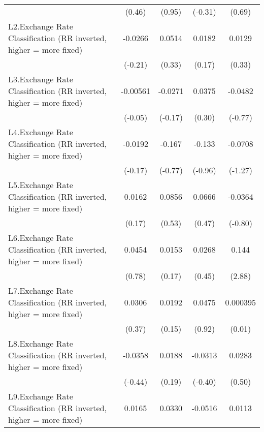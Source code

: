 {\begin{longtable}{l*{4}{c}}
                &   (0.46)         &   (0.95)         &  (-0.31)         &   (0.69)         \\
[1em]
L2.Exchange Rate Classification (RR inverted, higher = more fixed)&  -0.0266         &   0.0514         &   0.0182         &   0.0129         \\
                &  (-0.21)         &   (0.33)         &   (0.17)         &   (0.33)         \\
[1em]
L3.Exchange Rate Classification (RR inverted, higher = more fixed)& -0.00561         &  -0.0271         &   0.0375         &  -0.0482         \\
                &  (-0.05)         &  (-0.17)         &   (0.30)         &  (-0.77)         \\
[1em]
L4.Exchange Rate Classification (RR inverted, higher = more fixed)&  -0.0192         &   -0.167         &   -0.133         &  -0.0708         \\
                &  (-0.17)         &  (-0.77)         &  (-0.96)         &  (-1.27)         \\
[1em]
L5.Exchange Rate Classification (RR inverted, higher = more fixed)&   0.0162         &   0.0856         &   0.0666         &  -0.0364         \\
                &   (0.17)         &   (0.53)         &   (0.47)         &  (-0.80)         \\
[1em]
L6.Exchange Rate Classification (RR inverted, higher = more fixed)&   0.0454         &   0.0153         &   0.0268         &    0.144\sym{**} \\
                &   (0.78)         &   (0.17)         &   (0.45)         &   (2.88)         \\
[1em]
L7.Exchange Rate Classification (RR inverted, higher = more fixed)&   0.0306         &   0.0192         &   0.0475         & 0.000395         \\
                &   (0.37)         &   (0.15)         &   (0.92)         &   (0.01)         \\
[1em]
L8.Exchange Rate Classification (RR inverted, higher = more fixed)&  -0.0358         &   0.0188         &  -0.0313         &   0.0283         \\
                &  (-0.44)         &   (0.19)         &  (-0.40)         &   (0.50)         \\
[1em]
L9.Exchange Rate Classification (RR inverted, higher = more fixed)&   0.0165         &   0.0330         &  -0.0516         &   0.0113         \\

\end{longtable}}
